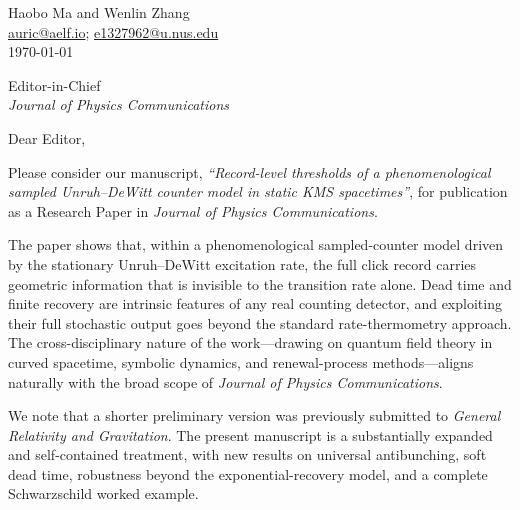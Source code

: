 \documentclass[11pt]{article}
\begin{document}
\begin{flushright}
Haobo Ma and Wenlin Zhang\\
\href{mailto:auric@aelf.io}{auric@aelf.io}; \href{mailto:e1327962@u.nus.edu}{e1327962@u.nus.edu}\\
\today
\end{flushright}

Editor-in-Chief\\
\emph{Journal of Physics Communications}

Dear Editor,

Please consider our manuscript, \emph{``Record-level thresholds of a phenomenological sampled Unruh--DeWitt counter model in static KMS spacetimes''}, for publication as a Research Paper in \emph{Journal of Physics Communications}.

The paper shows that, within a phenomenological sampled-counter model driven by the stationary Unruh--DeWitt excitation rate, the full click record carries geometric information that is invisible to the transition rate alone. Dead time and finite recovery are intrinsic features of any real counting detector, and exploiting their full stochastic output goes beyond the standard rate-thermometry approach. The cross-disciplinary nature of the work---drawing on quantum field theory in curved spacetime, symbolic dynamics, and renewal-process methods---aligns naturally with the broad scope of \emph{Journal of Physics Communications}.

We note that a shorter preliminary version was previously submitted to \emph{General Relativity and Gravitation}. The present manuscript is a substantially expanded and self-contained treatment, with new results on universal antibunching, soft dead time, robustness beyond the exponential-recovery model, and a complete Schwarzschild worked example.
\end{document}
